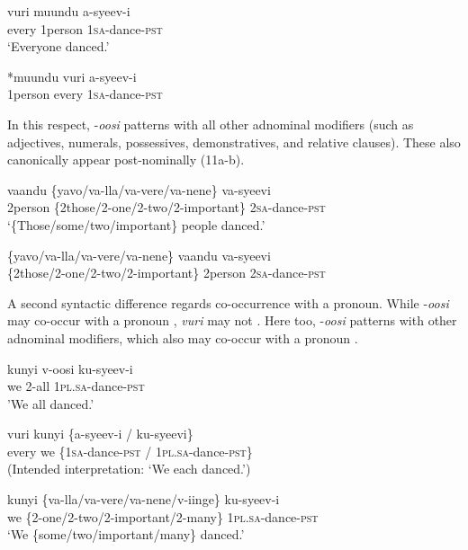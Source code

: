 \documentclass[output=paper]{langsci/langscibook}
\begin{document}
\ea
\gll vuri    muundu  a-syeev-i    \\
     every    1person  1\textsc{sa}-dance-\textsc{pst}       \\
\glt ‘Everyone danced.’
\z

\ea
\gll \textup{*}muundu  vuri    a-syeev-i  \\
     1person    every    1\textsc{sa}-dance-\textsc{pst}    \\
\z

In this respect, -\textit{oosi} patterns with all other adnominal modifiers (such as adjectives, numerals, possessives, demonstratives, and relative clauses). These also canonically appear post-nominally (11a-b). 

\ea
\gll vaandu  \{yavo/va-lla/va-vere/va-nene\}    va-syeevi  \\
     2person  \{2those/2-one/2-two/2-important\} 2\textsc{sa}-dance-\textsc{pst}\\
\glt ‘\{Those/some/two/important\} people danced.’
\z

\ea
\gll *\{yavo/va-lla/va-vere/va-nene\}  vaandu   va-syeevi\\
     \{2those/2-one/2-two/2-important\}  2person  2\textsc{sa}-dance-\textsc{pst}\\
\z

A second syntactic difference regards co-occurrence with a pronoun. While -\textit{oosi} may co-occur with a pronoun , \textit{vuri} may not . Here too, -\textit{oosi} patterns with other adnominal modifiers, which also may co-occur with a pronoun .

\ea
\gll kunyi  v-oosi    ku-syeev-i      \\
     we  2-all    1\textsc{pl}.\textsc{sa}-dance-\textsc{pst}\\
\glt 'We all danced.'
\z

\ea
\gll *vuri  kunyi    \{a-syeev-i / ku-syeevi\}  \\
     every  we    \{1\textsc{sa}-dance-\textsc{pst} / 1\textsc{pl}.\textsc{sa}-dance-\textsc{pst\}}\\
\glt (Intended interpretation: ‘We each danced.’)
\z

\ea
\gll kunyi \{va-lla/va-vere/va-nene/v-iinge\}     ku-syeev-i\\
     we    \{2-one/2-two/2-important/2-many\} 1\textsc{pl}.\textsc{sa}-dance-\textsc{pst}\\
\glt ‘We \{some/two/important/many\} danced.’
\z
\end{document}
